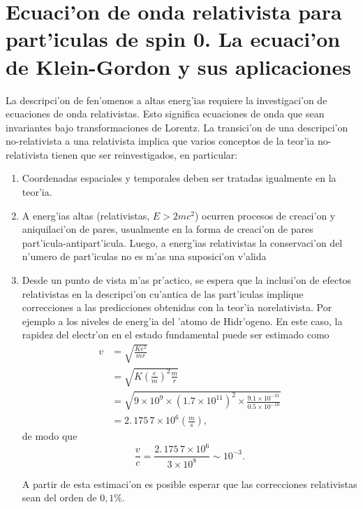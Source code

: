 \chapter{Ecuaci'on de onda relativista para part'iculas de spin 0. La
ecuaci'on de Klein-Gordon y sus aplicaciones}

La descripci'on de fen'omenos a altas energ'ias requiere la
investigaci'on de ecuaciones de onda relativistas. Esto significa
ecuaciones de onda que sean invariantes bajo transformaciones de Lorentz. La
transici'on de una descripci'on no-relativista a una relativista
implica que varios conceptos de la teor'ia no-relativista tienen que ser
reinvestigados, en particular:

\begin{enumerate}
\item Coordenadas espaciales y temporales deben ser tratadas igualmente en
la teor'ia.

\item A energ'ias altas (relativistas, $E>2mc^2$) ocurren procesos de creaci'on
y aniquilaci'on de pares, usualmente en la forma de creaci'on de pares
part'icula-antipart'icula. Luego, a energ'ias relativistas la
conservaci'on del n'umero de part'iculas no es m'as una
suposici'on v'alida
\item Desde un punto de vista m'as pr'actico, se espera que la inclusi'on de
efectos relativistas en la descripci'on cu'antica de las part'iculas implique
correcciones a las predicciones obtenidas con la teor'ia norelativista. Por
ejemplo a los niveles de energ'ia del 'atomo de Hidr'ogeno. En este
caso, la rapidez del electr'on en el estado fundamental puede ser
estimado como
\begin{align}
v  & =\sqrt{\frac{Ke^{2}}{mr}}\\
& =\sqrt{K\left(  \frac{e}{m}\right)  ^{2}\frac{m}{r}}\\
& =\sqrt{9\times10^{9}\times\left(  1.7\times10^{11}\right)  ^{2}\times
\frac{9.1\times10^{-31}}{0.5\times10^{-10}}}\\
& =2.\,\allowbreak175\,7\times10^{6}\left(  \frac{m}{s}\right)  ,
\end{align}
de modo que
\begin{equation}
\frac{v}{c}=\frac{2.\,\allowbreak175\,7\times10^{6}}{3\times10^{8}}\sim
10^{-3}.
\end{equation}

A partir de esta estimaci'on es posible esperar que las correcciones
relativistas sean del orden de $0,1\%$.


\end{enumerate}

